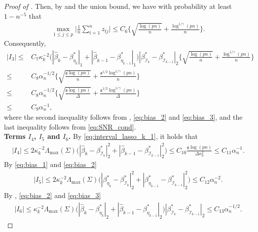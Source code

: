 \documentclass[11pt]{article}
\newcommand{\I}{{\mathcal I }}
\newcommand{\s}{ { \mathfrak{s}  } }
\theoremstyle{plain}
\theoremstyle{definition}
\begin{document}
\begin{proof}[Proof of ]
Then, by  and the union bound, we have with probability at least $1 - n^{-5}$ that
\begin{align*}
  \max_{1 \leq j \leq p}\bigg | \frac{1}{n}\sum_{t=1}^n z_{tj}  \bigg |  \le  C_6 \bigg\{  \sqrt { \frac{\log(pn) }{n}  }  +   \frac{ \log^{1/\gamma }( pn) }{n} \bigg \}.
\end{align*}
Consequently,
\begin{align*}
    |I_3| \leq& C_7\kappa_k^{-2}\big(|\widehat{\beta}_{k} - \beta_{\eta_k}^*|_1 +  |\widehat{\beta}_{k-1} - \beta_{\eta_{k-1}}^*|_1\big)|\beta^*_{\mathcal{I}_{k}} - \beta^*_{\mathcal{I}_{k-1}}|_2\bigg\{  \sqrt { \frac{\log(pn) }{n}  }  +   \frac{ \log^{1/\gamma }( pn) }{n} \bigg \}\\
    \leq& C_8\alpha_n^{-1/2}\bigg\{  \sqrt { \frac{\s\log(pn) }{n}  }  +   \frac{\s^{1/2} \log^{1/\gamma }( pn) }{n} \bigg \}\\
    \leq& C_8\alpha_n^{-1/2}\bigg\{  \sqrt { \frac{\s\log(pn) }{\Delta}  }  +   \frac{\s^{1/2} \log^{1/\gamma }( pn) }{\Delta} \bigg \}\\
    \leq& C_9\alpha_n^{-1},
\end{align*}
where the second inequality follows from , \eqref{eq:bias_2} and \eqref{eq:bias_3}, and the last inequality follows from \eqref{eq:SNR_cond}.
\
\\
\textbf{Terms $I_4$, $I_5$ and $I_6$.} By \eqref{eq:interval_lasso_k_1}, it holds that
\begin{align*}
    |I_4| \leq 2\kappa_k^{-2}\Lambda_{\max}(\Sigma)\big(| \widehat \beta_k -\beta^*_{\I_k}  | _2^2 + | \widehat \beta_{k-1} -\beta^*_{\I_{k-1}}  | _2^2\big) \leq C_{10}\frac{\s\log(pn)}{\Delta\kappa_k^2} \leq C_{11}\alpha_n^{-1}.
\end{align*}
By \eqref{eq:bias_1} and \eqref{eq:bias_2}
\begin{align*}
    |I_5| \leq 2\kappa_k^{-2}\Lambda_{\max}(\Sigma)\big(| \beta^*_{\eta_k} -\beta^*_{\I_k}  | _2^2 + | \beta^*_{\eta_{k-1}} -\beta^*_{\I_{k-1}}  | _2^2\big) \leq C_{12}\alpha_n^{-2}.
\end{align*}
By , \eqref{eq:bias_2} and \eqref{eq:bias_3}
\begin{align*}
    |I_6| \leq \kappa_k^{-2}\Lambda_{\max}(\Sigma)\big(| \widehat \beta_k -\beta^*_{\eta_k}  | _2 + | \widehat \beta_{k-1} -\beta^*_{\eta_{k-1}}  | _2\big)|\beta^*_{\I_{k}} - \beta^*_{\I_{k-1}}|_2 \leq C_{13}\alpha_n^{-1/2}.
\end{align*}

\end{proof}
\end{document}
